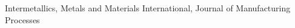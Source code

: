 

\begin{cvparagraph}

\textcolor{russell}{Intermetallics, Metals and Materials International, Journal of Manufacturing Processes}
\end{cvparagraph}